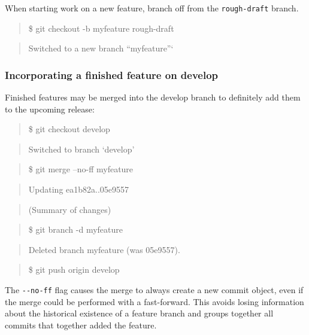 \documentclass[]{book}
\begin{document}
When starting work on a new feature, branch off from the
\texttt{rough-draft} branch.

\begin{quote}
\$ git checkout -b myfeature rough-draft
\end{quote}

\begin{quote}
Switched to a new branch ``myfeature''`
\end{quote}

\subsubsection{Incorporating a finished feature on
develop}\label{incorporating-a-finished-feature-on-develop}

Finished features may be merged into the develop branch to definitely
add them to the upcoming release:

\begin{quote}
\$ git checkout develop
\end{quote}

\begin{quote}
Switched to branch `develop'
\end{quote}

\begin{quote}
\$ git merge --no-ff myfeature
\end{quote}

\begin{quote}
Updating ea1b82a..05e9557
\end{quote}

\begin{quote}
(Summary of changes)
\end{quote}

\begin{quote}
\$ git branch -d myfeature
\end{quote}

\begin{quote}
Deleted branch myfeature (was 05e9557).
\end{quote}

\begin{quote}
\$ git push origin develop
\end{quote}

The \texttt{-\/-no-ff} flag causes the merge to always create a new
commit object, even if the merge could be performed with a fast-forward.
This avoids losing information about the historical existence of a
feature branch and groups together all commits that together added the
feature.
\end{document}
